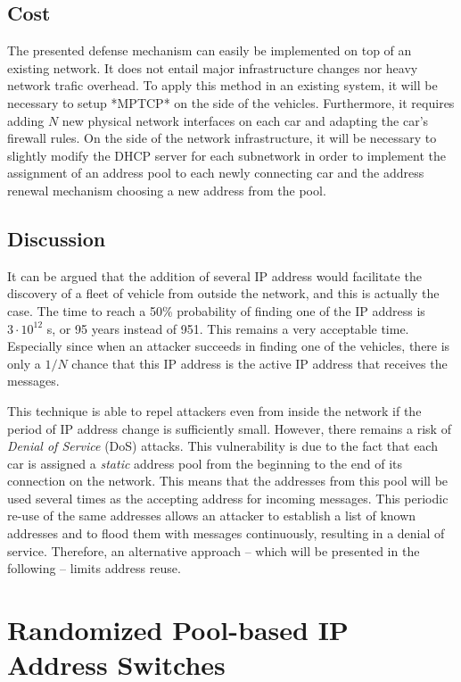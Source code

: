 \subsection{Cost} 

The presented defense mechanism can easily be implemented on top of an
existing network. It does not entail major infrastructure changes nor
heavy network trafic overhead. To apply this method in an existing
system, it will be necessary to setup *MPTCP* on the side of the
vehicles. Furthermore, it requires adding $N$ new physical network
interfaces on each car and adapting the car's firewall rules. On the
side of the network infrastructure, it will be necessary to slightly
modify the DHCP server for each subnetwork in order to implement the
assignment of an address pool to each newly connecting car and the
address renewal mechanism choosing a new address from the pool.

\subsection{ Discussion} 

It can be argued that the addition of several IP address would
facilitate the discovery of a fleet of vehicle from outside the
network, and this is actually the case.  The time to reach a 50\%
probability of finding one of the IP address is $3 \cdot 10^{12}$ s,
or 95 years instead of 951.  This remains a very acceptable
time. Especially since when an attacker succeeds in finding one of the
vehicles, there is only a $1/N$ chance that this IP address is the
active IP address that receives the messages.


This technique is able to repel attackers even from inside the network
if the period of IP address change is sufficiently small. However,
there remains a risk of \emph{Denial of Service} (DoS) attacks. This
vulnerability is due to the fact that each car is assigned a
\emph{static} address pool from the beginning to the end of its
connection on the network. This means that the addresses from this
pool will be used several times as the accepting address for incoming
messages.  This periodic re-use of the same addresses allows an
attacker to establish a list of known addresses and to flood them with
messages continuously, resulting in a denial of service. Therefore, an
alternative approach -- which will be presented in the following --
limits address reuse.

\section{Randomized Pool-based IP Address Switches}

